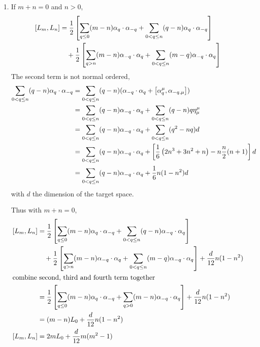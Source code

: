 \begin{enumerate}[label=(\alph*)]
	\item If $m+n = 0$ and $n>0$,
		\begin{align*}
			\comm{L_m}{L_n} &= \frac{1}{2} \left[ \sum_{q \leq 0} (m-n) \alpha_{q} \cdot \alpha_{-q} + \sum_{0 < q \leq n}(q-n) \alpha_{q} \cdot \alpha_{-q}  \right]  \\
								 &\quad + \frac{1}{2} \left[  \sum_{q > n} (m-n)\alpha_{-q} \cdot \alpha_{q} + \sum_{0 < q \leq n}  (m-q)\alpha_{-q} \cdot \alpha_{q}\right] 
		\end{align*}
		The second term is not normal ordered,
		\begin{align*}
			\sum_{0 < q \leq n}(q-n) \alpha_{q} \cdot \alpha_{-q} &= \sum_{0 < q \leq n} (q-n) ( \alpha_{-q} \cdot \alpha_{q} + \comm{\alpha_q^\mu}{\alpha_{-q,\mu}} ) \\
																					&= \sum_{0 < q \leq n} (q-n)  \alpha_{-q} \cdot \alpha_{q} + \sum_{0<q\leq n} (q-n) q \eta^\mu_\mu  \\
																					&= \sum_{0 < q \leq n} (q-n)  \alpha_{-q} \cdot \alpha_{q} + \sum_{0<q\leq n} (q^2 - nq) d \\
																					&= \sum_{0 < q \leq n} (q-n)  \alpha_{-q} \cdot \alpha_{q} + \left[ \frac{1}{6} \left( 2n^3 + 3 n^2 + n \right) - n \frac{n}{2} (n+1) \right] d \\
																					&= \sum_{0 < q \leq n} (q-n)  \alpha_{-q} \cdot \alpha_{q} + \frac{1}{6} n (1-n^2) d 
		\end{align*}
		with $d$ the dimension of the target space.

		Thus with $m+n=0$,
		\begin{align*}
			\comm{L_m}{L_n} &= \frac{1}{2} \left[ \sum_{q \leq 0} (m-n) \alpha_{q} \cdot \alpha_{-q} + \sum_{0 < q \leq n}(q-n)  \alpha_{-q} \cdot \alpha_{q}  \right]  \\
								 &\quad + \frac{1}{2} \left[  \sum_{q > n} (m-n)\alpha_{-q} \cdot \alpha_{q} + \sum_{0 < q \leq n}  (m-q)\alpha_{-q} \cdot \alpha_{q}\right]  + \frac{d}{12} n (1-n^2) \\
								 \shortintertext{combine second, third and fourth term together}
								 &= \frac{1}{2}\left[ \sum_{q\leq 0} (m-n) \alpha_q \cdot \alpha_{-q} + \sum_{q > 0} (m-n) \alpha_{-q} \cdot \alpha_{q} \right] + \frac{d}{12} n (1-n^2) \\
								 &= (m-n) L_0 + \frac{d}{12} n (1-n^2) \\
			\comm{L_m}{L_n} &= 2m L_0 + \frac{d}{12} m (m^2-1) \\
		\end{align*}

\end{enumerate}
